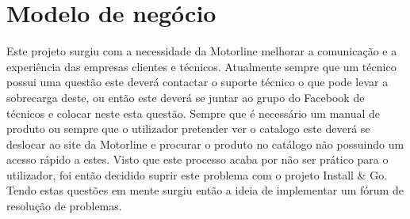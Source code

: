 \section{Modelo de negócio}

Este projeto surgiu com a necessidade da Motorline melhorar a comunicação e a experiência das 
empresas clientes e técnicos. 
Atualmente sempre que um técnico possui uma questão este deverá contactar o suporte técnico o que pode 
levar a sobrecarga deste, ou então este deverá se juntar ao grupo do Facebook de técnicos e colocar 
neste esta questão. Sempre que é necessário um manual de produto ou sempre que o utilizador pretender ver 
o catalogo este deverá se deslocar ao site da Motorline e procurar o produto no catálogo não possuindo um
acesso rápido a estes.
Visto que este processo acaba por não ser prático para o utilizador, foi então 
decidido suprir este problema com o projeto Install \& Go. Tendo estas questões em mente surgiu então 
a ideia de implementar um fórum de resolução de problemas.
